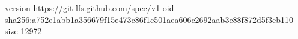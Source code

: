 version https://git-lfs.github.com/spec/v1
oid sha256:a752e1abb1a356679f15e473c86f1c501aea606c2692aab3e88f872d5f3eb110
size 12972
